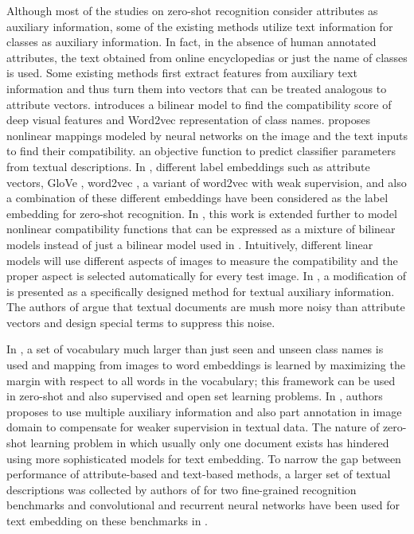 \documentclass[10pt,twocolumn,letterpaper]{article}
\begin{document}
 Although most of the studies on zero-shot recognition consider attributes as auxiliary information, some of the existing methods utilize text information for classes as auxiliary information. In fact, in the absence of human annotated attributes, the text obtained from online encyclopedias or just the name of classes is used. Some existing methods first extract features from auxiliary text information and thus turn them into vectors that can be treated analogous to attribute vectors.
 \cite{devise} introduces a bilinear model to find the compatibility score of deep visual features and Word2vec \cite{word2vec} representation of class names. \cite{ba2015} proposes nonlinear mappings modeled by neural networks on the image and the text inputs to find their compatibility.
  \cite{mohamed13} an objective function to predict classifier parameters from textual descriptions.
 In \cite{Akata2015}, different label embeddings such as attribute vectors, GloVe \cite{pennington2014glove}, word2vec \cite{word2vec}, a variant of word2vec with weak supervision, and also a combination of these different embeddings have been considered as the label embedding for zero-shot recognition. In \cite{Xian2016}, this work is extended further to model nonlinear compatibility functions that can be expressed as a mixture of bilinear models instead of just a bilinear model used in \cite{Akata2015}. Intuitively, different linear models will use different aspects of images to measure the compatibility and the proper aspect is selected automatically for every test image.
  In \cite{Qiao2016}, a modification of \cite{emb15} is presented as a specifically designed method for textual auxiliary information. The authors of \cite{Qiao2016}
  argue that textual documents are mush more noisy than attribute vectors and design special terms to suppress this noise.

In \cite{Fu2016}, a set of vocabulary much larger than just seen and unseen class names is used and mapping from images to word embeddings is learned
by  maximizing the margin with respect to all words in the vocabulary; this framework can be used in zero-shot and also supervised and open set learning problems.
In  \cite{Akata2016}, authors proposes to use multiple auxiliary information and also  part annotation in image domain to compensate for weaker supervision in textual data.
The nature of zero-shot learning problem in which usually only one document exists has hindered using more sophisticated models for text embedding.
To narrow the gap between performance of attribute-based and text-based methods, a larger set of textual descriptions was collected
by authors of \cite{Akata2016rnn} for two fine-grained recognition benchmarks and convolutional and recurrent neural networks have been used for text embedding on these benchmarks in \cite{Akata2016rnn}.
\end{document}

